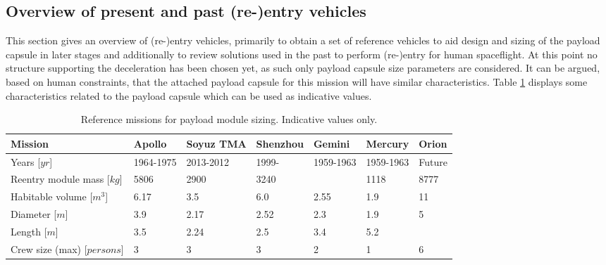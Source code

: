 \subsection{Overview of present and past (re-)entry vehicles}\label{cha:past missions}
This section gives an overview of (re-)entry vehicles, primarily to obtain a set of reference vehicles to aid design and sizing of the payload capsule in later stages and additionally to review solutions used in the past to perform (re-)entry for human spaceflight. At this point no structure supporting the deceleration has been chosen yet, as such only payload capsule size parameters are considered. It can be argued, based on human constraints, that the attached payload capsule for this mission will have similar characteristics. Table \ref{tab:refmis} displays some characteristics related to the payload capsule which can be used as indicative values. 


\begin{table}[H]
	\caption{Reference missions for payload module sizing. Indicative values only.}
		\begin{tabular}{|p{}|p{}|p{}|p{}|p{}|p{}|p{}|} %
			\hline
			Mission 						& Apollo & 	Soyuz TMA &	Shenzhou & Gemini & Mercury & Orion \\ \hline \hline
			Years [$yr$]						  	&	1964-1975	& 	2013-2012 &	1999- &   1959-1963  & 1959-1963 & Future \\ \hline
			Reentry module mass [$kg$]  	&	5806& 	2900 &	3240 &     & 1118 & 8777 \\ \hline
			Habitable volume [$m^3$]		&	6.17& 	3.5  &	6.0  & 2.55 & 1.9 & 11   \\ \hline
			Diameter [$m$]			 		&	3.9 & 	2.17  &	2.52 & 2.3 & 1.9 & 5   \\ \hline
			Length  [$m$]			 		&	3.5 & 	2.24  &	2.5  & 3.4 &  5.2 &    \\ \hline
			Crew size (max) [$persons$]		&	3   & 	3     &	3    & 2   &  1   & 6   \\ \hline
		\end{tabular}
    \label{tab:refmis}
\end{table}


